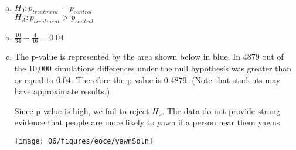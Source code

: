 {{
\begin{enumerate}[(a)]
\setlength{\itemsep}{0mm}
\item $H_0: p_{treatment} = p_{control}$ \\
$H_A: p_{treatment} > p_{control}$
\item $\frac{10}{34} - \frac{4}{16} = 0.04$
\item The p-value is represented by the area shown below in blue. In 4879 out of the 10,000 simulations differences under the null hypothesis was greater than or equal to 0.04. Therefore the p-value is 0.4879. (Note that students may have approximate results.) \\
\noindent \begin{minipage}[c]{0.5\textwidth}
Since p-value is high, we fail to reject $H_0$. The data do not provide strong evidence that people are more likely to yawn if a person near them yawns
\end{minipage}
\begin{minipage}[c]{0.5\textwidth}
\begin{center}
\texttt{[image: 06/figures/eoce/yawnSoln]}
\end{center}
\end{minipage}
\end{enumerate}
}
}




%
%	
